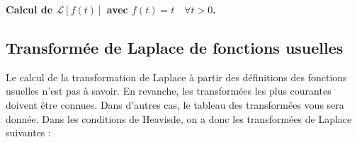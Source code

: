 \documentclass[11pt,oneside]{article}
\begin{document}
\begin{demo}
\textbf{Calcul de $\mathcal{L}\left[f(t) \right]$ avec $f(t)=t\quad \forall t> 0$.}

\end{demo}




\subsection{Transformée de Laplace de fonctions usuelles}
Le calcul de la transformation de Laplace à partir des définitions des fonctions usuelles n'est pas à savoir. En revanche, les transformées les plus courantes doivent être connues. Dans d'autres cas, le tableau des transformées vous sera donnée.
Dans les conditions de Heavisde, on a donc les transformées de Laplace suivantes :
\end{document}
